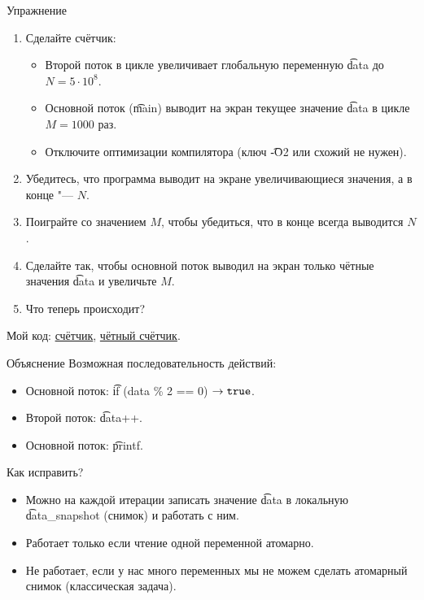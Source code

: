\begin{frame}{Упражнение}
	\begin{enumerate}
		\item Сделайте счётчик:
			\begin{itemize}
				\item Второй поток в цикле увеличивает глобальную переменную \t{data} до $N = 5 \cdot 10^8$.
				\item Основной поток (\t{main}) выводит на экран текущее значение \t{data} в цикле $M = 1000$ раз.
				\item Отключите оптимизации компилятора (ключ \t{-O2} или схожий не нужен).
			\end{itemize}
		\item Убедитесь, что программа выводит на экране увеличивающиеся значения, а в конце "--- $N$.
		\item Поиграйте со значением $M$, чтобы убедиться, что в конце всегда выводится $N$.
		\item Сделайте так, чтобы основной поток выводил на экран только чётные значения \t{data} и увеличьте $M$.
		\item Что теперь происходит?
	\end{enumerate}
	Мой код:
	\href{https://github.com/yeputons/fall-2016-paradigms/raw/master/161019/sources/05-counter.c}{счётчик},
	\href{https://github.com/yeputons/fall-2016-paradigms/raw/master/161019/sources/06-even-counter.c}{чётный счётчик}.
\end{frame}

\begin{frame}{Объяснение}
	Возможная последовательность действий:
	\begin{itemize}
		\item Основной поток: \t{if (data \% 2 == 0)} $\to \t{true}$.
		\item Второй поток: \t{data++}.
		\item Основной поток: \t{printf}.
	\end{itemize}
	Как исправить?
	\pause
	\begin{itemize}
		\item Можно на каждой итерации записать значение \t{data} в локальную \t{data\_snapshot} (снимок) и работать с ним.
		\item Работает только если чтение одной переменной атомарно.
		\item Не работает, если у нас много переменных мы не можем сделать атомарный снимок (классическая задача).
	\end{itemize}
\end{frame}

